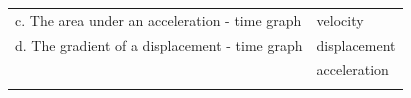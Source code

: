 \begin{enumerate}[noitemsep, label=\textbf{\arabic*}. ]
{{\begin{center}
\begin{xtabular}[t]{|l|l|}
    
        c. The area under an acceleration - time graph &
    
    
        velocity%
     \tabularnewline{}
    
    
        d. The gradient of a displacement - time graph &
    
    
        displacement%
     \tabularnewline{}
    
    
         &
    
    
        acceleration%
     \tabularnewline{}
    
    
         &
    
    

\end{xtabular}
\end{center}}}
\end{enumerate}
